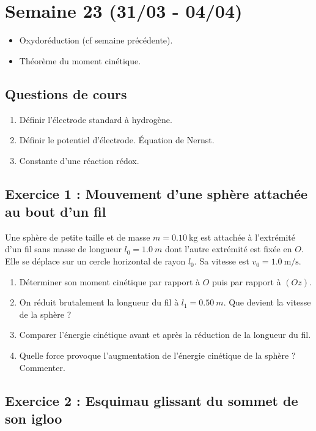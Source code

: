 \section{Semaine 23 (31/03 - 04/04) }


\begin{itemize}
	\item Oxydoréduction (cf semaine précédente).
	\item Théorème du moment cinétique.
\end{itemize}

\subsection{Questions de cours}

\begin{enumerate}
	\item Définir l'électrode standard à hydrogène.
	\item Définir le potentiel d'électrode. Équation de Nernst.
	\item Constante d'une réaction rédox.
\end{enumerate}

\subsection{Exercice 1 : Mouvement d'une sphère attachée au bout d'un fil}

Une sphère de petite taille et de masse $m = \SI{0.10}{\kilogram}$ est attachée à l'extrémité d'un fil sans masse de longueur $l_0 = \SI{1.0}{m}$ dont l'autre extrémité est fixée en $O$. Elle se déplace sur un cercle horizontal de rayon $l_0$. Sa vitesse est $v_0 = \SI{1.0}{\meter\per\second}$.

\begin{enumerate}
	\item Déterminer son moment cinétique par rapport à $O$ puis par rapport à $(Oz)$.
	\item On réduit brutalement la longueur du fil à $l_1 = \SI{0.50}{m}$. Que devient la vitesse de la sphère ?
	\item Comparer l'énergie cinétique avant et après la réduction de la longueur du fil. 
	\item Quelle force provoque l'augmentation de l'énergie cinétique de la sphère ? Commenter.
\end{enumerate}

\subsection{Exercice 2 : Esquimau glissant du sommet de son igloo}

